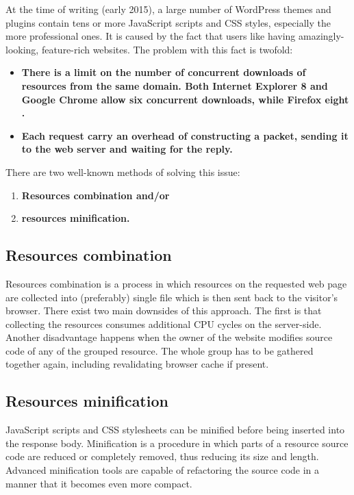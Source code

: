 At the time of writing (early 2015), a large number of WordPress themes and plugins contain tens or more JavaScript scripts and CSS styles, especially the more professional ones. It is caused by the fact that users like having amazingly-looking, feature-rich websites. The problem with this fact is twofold:
 
\begin{itemize}
	\item \textbf{There is a limit on the number of concurrent downloads of resources from the same domain. Both Internet Explorer 8 and Google Chrome allow six concurrent downloads, while Firefox eight \cite{SO:Browser-concurrent-downloads}.}
	\item \textbf{Each request carry an overhead of constructing a packet, sending it to the web server and waiting for the reply.}
\end{itemize}

There are two well-known methods of solving this issue:

\begin{enumerate}
    \item\textbf{Resources combination and/or}
    \item\textbf{resources minification.}
  \end{enumerate}

\subsection*{Resources combination}

Resources combination is a process in which resources on the requested web page are collected into (preferably) single file which is then sent back to the visitor’s browser. There exist two main downsides of this approach. The first is that collecting the resources consumes additional CPU cycles on the server-side. Another disadvantage happens when the owner of the website modifies source code of any of the grouped resource. The whole group has to be gathered together again, including revalidating browser cache if present.

\subsection*{Resources minification}

JavaScript scripts and CSS stylesheets can be minified before being inserted into the response body. Minification is a procedure in which parts of a resource source code are reduced or completely removed, thus reducing its size and length. Advanced minification tools are capable of refactoring the source code in a manner that it becomes even more compact.

